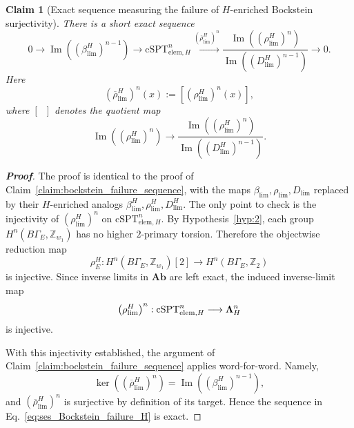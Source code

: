 \documentclass[aps,prx,reprint,superscriptaddress,twocolumn,amsmath,amssymb,amsfonts, nofootinbib]{revtex4-2}
\theoremstyle{apsstyle}
\newtheorem{claim}{Claim}
\begin{document}
\begin{claim}[Exact sequence measuring the failure of $H$-enriched Bockstein surjectivity]
\label{claim:bockstein_failure_sequence_H}
There is a short exact sequence
\begin{equation}
\label{eq:ses_Bockstein_failure_H}
0
\rightarrow
\operatorname{Im}\left(\left(\beta_{\lim}^{H}\right)^{n-1}\right)
\rightarrow
\mathrm{cSPT}_{\mathrm{elem},H}^{n}
\xrightarrow{\left(\overline{\rho}_{\lim}^{H}\right)^{n}}
\dfrac{
\operatorname{Im}\left(\left(\rho_{\lim}^{H}\right)^{n}\right)
}{
\operatorname{Im}\left(\left(D_{\lim}^{H}\right)^{n-1}\right)
}
\rightarrow
0.
\end{equation}
Here
\begin{equation}
\left(\overline{\rho}_{\lim}^{H}\right)^{n}(x)
:=
\left[
\left(\rho_{\lim}^{H}\right)^n(x)
\right],
\end{equation}
where $[\;\;]$ denotes the quotient map
\begin{equation}
\operatorname{Im}\left(\left(\rho_{\lim}^{H}\right)^n\right)
\longrightarrow
\dfrac{
\operatorname{Im}\left(\left(\rho_{\lim}^{H}\right)^n\right)
}{
\operatorname{Im}\left(\left(D_{\lim}^{H}\right)^{n-1}\right)
}.
\end{equation}
\end{claim}

\begin{proof}[\textnormal{\textbf{Proof}}]
The proof is identical to the proof of Claim~\ref{claim:bockstein_failure_sequence}, with the maps $\beta_{\lim},\rho_{\lim},D_{\lim}$
replaced by their $H$-enriched analogs $\beta_{\lim}^{H},\rho_{\lim}^{H},D_{\lim}^{H}$. The only point to check is the injectivity of $(\rho_{\lim}^{H})^{n}$ on $\mathrm{cSPT}_{\mathrm{elem},H}^{n}$. By Hypothesis~\ref{hyp:2}, each group $H^{n}(B\Gamma_E,\mathbb Z_{w_1})$ has no higher $2$-primary torsion. Therefore the objectwise reduction map
\begin{equation*}
\rho_E^{H}: H^{n}(B\Gamma_E,\mathbb Z_{w_1})[2] \longrightarrow H^{n}(B\Gamma_E,\mathbb Z_2)
\end{equation*}
is injective. Since inverse limits in $\mathbf{Ab}$ are left exact, the induced inverse-limit map
\begin{equation*}
\left(\rho_{\lim}^{H}\right)^{n}:
\mathrm{cSPT}_{\mathrm{elem},H}^{n}
\longrightarrow
{\bf \Lambda}_{H}^{n}
\end{equation*}
is injective.

\noindent With this injectivity established, the argument of Claim~\ref{claim:bockstein_failure_sequence} applies word-for-word. Namely,
\begin{equation*}
\ker\left((\overline{\rho}_{\lim}^{H})^{n}\right)
= \operatorname{Im}\left((\beta_{\lim}^{H})^{n-1}\right),
\end{equation*}
and $\left(\overline{\rho}_{\lim}^{H}\right)^{n}$ is surjective by definition of its target. Hence the sequence in Eq.~\eqref{eq:ses_Bockstein_failure_H} is exact.
\end{proof}
\end{document}
